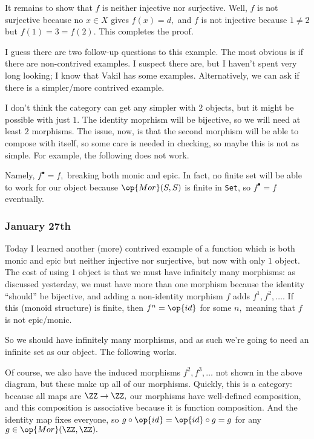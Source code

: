 It remains to show that $f$ is neither injective nor surjective. Well, $f$ is not surjective because no $x\in X$ gives $f(x)=d,$ and $f$ is not injective because $1\ne 2$ but $f(1)=3=f(2).$ This completes the proof.

I guess there are two follow-up questions to this example. The most obvious is if there are non-contrived examples. I suspect there are, but I haven't spent very long looking; I know that Vakil has some examples. Alternatively, we can ask if there is a simpler/more contrived example.

I don't think the category can get any simpler with $2$ objects, but it might be possible with just $1.$ The identity moprhism will be bijective, so we will need at least $2$ morphisms. The issue, now, is that the second morphism will be able to compose with itself, so some care is needed in checking, so maybe this is not as simple. For example, the following does not work.
\begin{center}
\end{center}
Namely, $f^\bullet=f,$ breaking both monic and epic. In fact, no finite set will be able to work for our object because $\op{Mor}(S,S)$ is finite in \texttt{Set}, so $f^\bullet=f$ eventually.

\subsubsection{January 27th}
Today I learned another (more) contrived example of a function which is both monic and epic but neither injective nor surjective, but now with only $1$ object. The cost of using $1$ object is that we must have infinitely many morphisms: as discussed yesterday, we must have more than one morphism because the identity ``should'' be bijective, and adding a non-identity morphism $f$ adds $f^1,f^2,\ldots.$ If this (monoid structure) is finite, then $f^n=\op{id}$ for some $n,$ meaning that $f$ is not epic/monic.

So we should have infinitely many morphisms, and as such we're going to need an infinite set as our object. The following works.
\begin{center}
\end{center}
Of course, we also have the induced morphisms $f^2,f^3,\ldots$ not shown in the above diagram, but these make up all of our morphisms. Quickly, this is a category: because all maps are $\ZZ\to\ZZ,$ our morphisms have well-defined composition, and this composition is associative because it is function composition. And the identity map fixes everyone, so $g\circ\op{id}=\op{id}\circ g=g$ for any $g\in\op{Mor}(\ZZ,\ZZ).$

